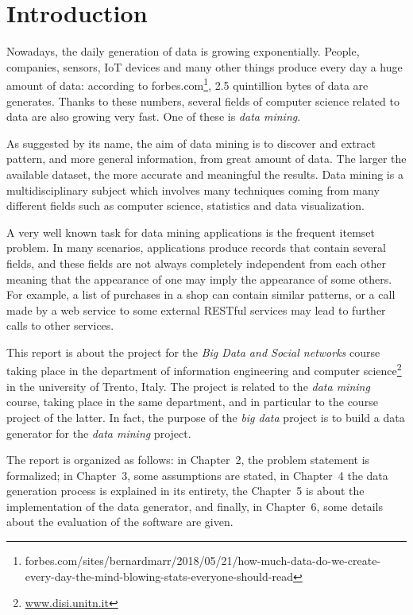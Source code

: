\documentclass{acm_proc_article-sp-sigmod09}
\begin{document}


\section{Introduction}
Nowadays, the daily generation of data is growing exponentially. People, companies, sensors, IoT devices and many other things produce every day a huge amount of data: according to forbes.com\footnote{forbes.com/sites/bernardmarr/2018/05/21/how-much-data-do-we-create-every-day-the-mind-blowing-stats-everyone-should-read}, 2.5 quintillion bytes of data are generates. Thanks to these numbers, several fields of computer science related to data are also growing very fast. One of these is \emph{data mining}.

As suggested by its name, the aim of data mining is to discover and extract pattern, and more general information, from great amount of data. The larger the available dataset, the more accurate and meaningful the results. Data mining is a multidisciplinary subject which involves many techniques coming from many different fields such as computer science, statistics and data visualization.

A very well known task for data mining applications is the frequent itemset problem. In many scenarios, applications produce records that contain several fields, and these fields are not always completely independent from each other meaning that the appearance of one may imply the appearance of some others. For example, a list of purchases in a shop can contain similar patterns, or a call made by a web service to some external RESTful services may lead to further calls to other services.

This report is about the project for the \emph{Big Data and Social networks} course taking place in the department of information engineering and computer science\footnote{\url{www.disi.unitn.it}} in the university of Trento, Italy. The project is related to the \emph{data mining} course, taking place in the same department, and in particular to the course project of the latter. In fact, the purpose of the \emph{big data} project is to build a data generator for the \emph{data mining} project.

The report is organized as follows: in Chapter~2, the problem statement is formalized; in Chapter~3, some assumptions are stated, in Chapter~4 the data generation process is explained in its entirety, the Chapter~5 is about the implementation of the data generator, and finally, in Chapter~6, some details about the evaluation of the software are given.
\end{document}
